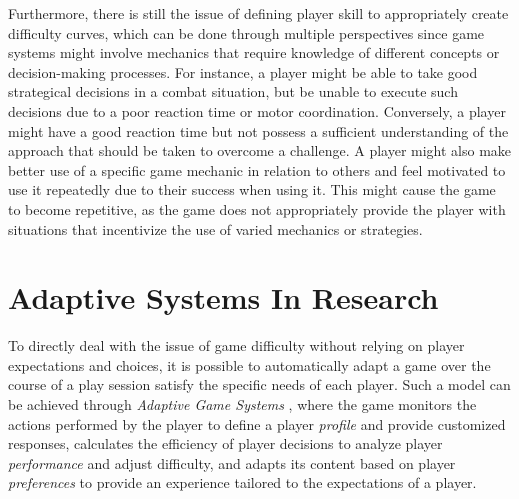 Furthermore, there is still the issue of defining player skill to appropriately create difficulty curves, which can be done through multiple perspectives since game systems might involve mechanics that require knowledge of different concepts or decision-making processes. For instance, a player might be able to take good strategical decisions in a combat situation, but be unable to execute such decisions due to a poor reaction time or motor coordination. Conversely, a player might have a good reaction time but not possess a sufficient understanding of the approach that should be taken to overcome a challenge. A player might also make better use of a specific game mechanic in relation to others and feel motivated to use it repeatedly due to their success when using it. This might cause the game to become repetitive, as the game does not appropriately provide the player with situations that incentivize the use of varied mechanics or strategies.


\section{Adaptive Systems In Research}

To directly deal with the issue of game difficulty without relying on player expectations and choices, it is possible to automatically adapt a game over the course of a play session satisfy the specific needs of each player. Such a model can be achieved through \emph{Adaptive Game Systems} \cite{ARTICLE_PlayerCentredGameDesign}, where the game monitors the actions performed by the player to define a player \emph{profile} and provide customized responses, calculates the efficiency of player decisions to analyze player \emph{performance} and adjust difficulty, and adapts its content based on player \emph{preferences} to provide an experience tailored to the expectations of a player.

